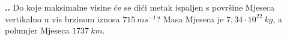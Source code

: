
\noindent 
\textbf{
\thecjelina.\thezadatak.}
Do koje maksimalne visine će se dići metak ispaljen s površine Mjeseca vertikalno u vis
brzinom iznosa $715\ ms^{-1}$? Masa Mjeseca je $7,34 \cdot 10^{22}\ kg$, a polumjer Mjeseca $1737\ km$.

